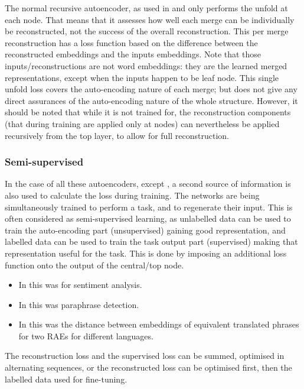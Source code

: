 \documentclass[12pt,parskip]{komatufte}
\begin{document}
The normal recursive autoencoder,
as used in \textcite{SocherEtAl2011:RAE} and \textcite{zhang2014BRAE} only performs the unfold at each node.
That means that it assesses how well each merge can be individually be reconstructed, not the success of the overall reconstruction.
This per merge reconstruction has a loss function based on the difference between the reconstructed embeddings and the inputs embeddings.
Note that those inputs/reconstructions are not word embeddings: they are the learned merged representations, except when the inputs happen to be leaf node. 
This single unfold loss covers the auto-encoding nature of each merge;
but does not give any direct assurances of the auto-encoding nature of the whole structure.
However, it should be noted that while it is not trained for, the reconstruction components (that during training are applied only at nodes) can nevertheless be applied recursively from the top layer, to allow for full reconstruction.

\subsubsection{Semi-supervised}
In the case of all these autoencoders, except \textcite{iyyer2014generating}, a second source of information is also used to calculate the loss during training.
The networks are being simultaneously trained to perform a task, and to regenerate their input.
This is often considered as semi-supervised learning, as unlabelled data can be used to train the auto-encoding part (unsupervised) gaining good representation, and labelled data can be used to train the task output part (supervised)  making that representation useful for the task.
This is done by imposing an additional loss function onto the output of the central/top node.
\begin{itemize}
 \item In \textcite{SocherEtAl2011:RAE} this was for sentiment analysis.
 \item In \textcite{SocherEtAl2011:PoolRAE} this was paraphrase detection.
 \item In \textcite{zhang2014BRAE} this was the distance between embeddings of equivalent translated phrases for two RAEs for different languages.
\end{itemize}
The reconstruction loss and the supervised loss can be summed, optimised in alternating sequences, or the reconstructed loss can be optimised first, then the labelled data used for fine-tuning.

 
\end{document}
